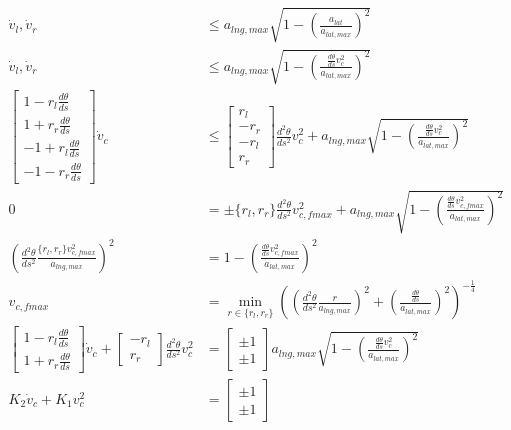 \documentclass{article}
\begin{document}
\begin{align*}
\dot{v}_l, \dot{v}_r &\le a_{lng, max} \sqrt{1 - \left(\frac{a_{lat}}{a_{lat,max}}\right)^2} \\
\dot{v}_l, \dot{v}_r &\le a_{lng, max} \sqrt{1 - \left(\frac{\frac{d\theta}{ds}v_c^2}{a_{lat,max}}\right)^2} \\
  \begin{bmatrix} 1 - r_l \frac{d\theta}{ds} \\ 1 + r_r \frac{d\theta}{ds} \\
 -1 + r_l \frac{d\theta}{ds} \\ -1 - r_r \frac{d\theta}{ds}
  \end{bmatrix} \dot{v}_c  &\le  \begin{bmatrix} r_l \\ -r_r \\ -r_l \\ r_r \end{bmatrix} \frac{d^2\theta}{ds^2} v_c^2
 + a_{lng, max} \sqrt{1 - \left(\frac{\frac{d\theta}{ds}v_c^2}{a_{lat,max}}\right)^2} \\
0 &= \pm \{r_l,r_r\} \frac{d^2\theta}{ds^2} v_{c,fmax}^2 +  a_{lng, max} \sqrt{1 -
  \left(\frac{\frac{d\theta}{ds}v_{c,fmax}^2}{a_{lat,max}}\right)^2} \\
\left(\frac{d^2\theta}{ds^2} \frac{\{r_l,r_r\}v_{c,fmax}^2}{a_{lng, max}}\right)^2 &=
  1 - \left(\frac{\frac{d\theta}{ds}v_{c,fmax}^2}{a_{lat,max}}\right)^2 \\
v_{c,fmax} &= \min_{r \in \{r_l, r_r\}}
\left(\left(\frac{d^2\theta}{ds^2} \frac{r}{a_{lng, max}}\right)^2 +
   \left(\frac{\frac{d\theta}{ds}}{a_{lat,max}}\right)^2\right)^{-\frac14} \\
\begin{bmatrix} 1 - r_l \frac{d\theta}{ds} \\ 1 + r_r \frac{d\theta}{ds}
\end{bmatrix} \dot{v}_c +   \begin{bmatrix} -r_l \\ r_r \end{bmatrix} \frac{d^2\theta}{ds^2} v_c^2
&= \begin{bmatrix}\pm 1 \\ \pm 1\end{bmatrix}
   a_{lng, max} \sqrt{1 - \left(\frac{\frac{d\theta}{ds}v_c^2}{a_{lat,max}}\right)^2} \\
K_2 \dot{v}_c + K_1 v_c^2
&= \begin{bmatrix}\pm 1 \\ \pm 1\end{bmatrix}

\end{align*}
\end{document}
